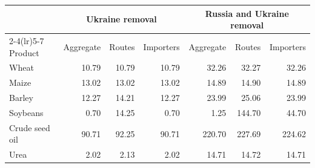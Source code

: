 \begin{tabular}{lrrrrrr}
\toprule
 & \multicolumn{3}{c}{Ukraine removal} & \multicolumn{3}{c}{Russia and Ukraine removal}\\
\cmidrule(lr){2-4}\cmidrule(lr){5-7}
Product & Aggregate & Routes & Importers & Aggregate & Routes & Importers \\
\midrule
Wheat & 10.79 & 10.79 & 10.79 & 32.26 & 32.27 & 32.26 \\
Maize & 13.02 & 13.02 & 13.02 & 14.89 & 14.90 & 14.89 \\
Barley & 12.27 & 14.21 & 12.27 & 23.99 & 25.06 & 23.99 \\
Soybeans & 0.70 & 14.25 & 0.70 & 1.25 & 144.70 & 44.70 \\
Crude seed oil & 90.71 & 92.25 & 90.71 & 220.70 & 227.69 & 224.62 \\
Urea & 2.02 & 2.13 & 2.02 & 14.71 & 14.72 & 14.71 \\
\bottomrule
\end{tabular}
